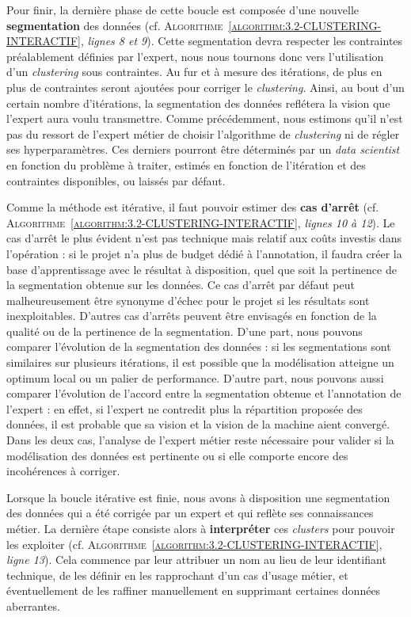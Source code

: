 		Pour finir, la dernière phase de cette boucle est composée d'une nouvelle \textbf{segmentation} des données (cf. \textsc{Algorithme~\ref{algorithm:3.2-CLUSTERING-INTERACTIF}}, \textit{lignes 8 et 9}).
		Cette segmentation devra respecter les contraintes préalablement définies par l'expert, nous nous tournons donc vers l'utilisation d'un \textit{clustering} sous contraintes.
		Au fur et à mesure des itérations, de plus en plus de contraintes seront ajoutées pour corriger le \textit{clustering}.
		Ainsi, au bout d'un certain nombre d'itérations, la segmentation des données reflétera la vision que l'expert aura voulu transmettre.
		Comme précédemment, nous estimons qu'il n'est pas du ressort de l'expert métier de choisir l'algorithme de \textit{clustering} ni de régler ses hyperparamètres.
		Ces derniers pourront être déterminés par un \textit{data scientist} en fonction du problème à traiter, estimés en fonction de l'itération et des contraintes disponibles, ou laissés par défaut.
		
		Comme la méthode est itérative, il faut pouvoir estimer des \textbf{cas d'arrêt} (cf. \textsc{Algorithme~\ref{algorithm:3.2-CLUSTERING-INTERACTIF}}, \textit{lignes 10 à 12}).
		Le cas d'arrêt le plus évident n'est pas technique mais relatif aux coûts investis dans l'opération : si le projet n'a plus de budget dédié à l'annotation, il faudra créer la base d'apprentissage avec le résultat à disposition, quel que soit la pertinence de la segmentation obtenue sur les données.
		Ce cas d'arrêt par défaut peut malheureusement être synonyme d'échec pour le projet si les résultats sont inexploitables.
		D'autres cas d'arrêts peuvent être envisagés en fonction de la qualité ou de la pertinence de la segmentation.
		D'une part, nous pouvons comparer l'évolution de la segmentation des données : si les segmentations sont similaires sur plusieurs itérations, il est possible que la modélisation atteigne un optimum local ou un palier de performance.
		D'autre part, nous pouvons aussi comparer l'évolution de l'accord entre la segmentation obtenue et l'annotation de l'expert : en effet, si l'expert ne contredit plus la répartition proposée des données, il est probable que sa vision et la vision de la machine aient convergé.
		Dans les deux cas, l'analyse de l'expert métier reste nécessaire pour valider si la modélisation des données est pertinente ou si elle comporte encore des incohérences à corriger.

		Lorsque la boucle itérative est finie, nous avons à disposition une segmentation des données qui a été corrigée par un expert et qui reflète ses connaissances métier.
		La dernière étape consiste alors à \textbf{interpréter} ces \textit{clusters} pour pouvoir les exploiter (cf. \textsc{Algorithme~\ref{algorithm:3.2-CLUSTERING-INTERACTIF}}, \textit{ligne 13}).
		Cela commence par leur attribuer un nom au lieu de leur identifiant technique, de les définir en les rapprochant d'un cas d'usage métier, et éventuellement de les raffiner manuellement en supprimant certaines données aberrantes.
		
